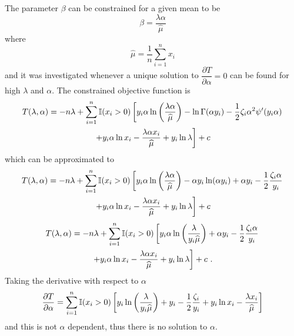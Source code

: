 The parameter $\beta$ can be constrained for a given mean to be
\begin{equation}
  \beta = \frac{\lambda\alpha}{\widehat{\mu}}
  \label{eq:compoundPoisson:beta_restrict}
\end{equation}
where
\begin{equation}
  \widehat{\mu} = \frac{1}{n}\sum_{i=1}^n x_i
\end{equation}
and it was investigated whenever a unique solution to $\dfrac{\partial T}{\partial \alpha} = 0$ can be found for high $\lambda$ and $\alpha$. The constrained objective function is
\begin{multline}
  T(\lambda,\alpha)
  =
  -n\lambda+
  \sum_{i=1}^n
  \mathbb{I}(x_i>0)
  \left[
  y_i\alpha
  \ln\left(\frac{\lambda\alpha}{\widehat{\mu}}\right)-\ln\Gamma(\alpha y_i) - \frac{1}{2}\zeta_i\alpha^2\psi'(y_i\alpha)
  \right.
  \\
  \left.
    +y_i\alpha\ln x_i - \frac{\lambda\alpha x_i}{\widehat{\mu}}
    + y_i \ln \lambda
    \vphantom{\frac{1}{1}}
  \right]
  + c
\end{multline}
which can be approximated to
\begin{multline*}
  T(\lambda,\alpha)=
  -n\lambda+
  \sum_{i=1}^n
  \mathbb{I}(x_i>0)
  \left[
    y_i\alpha\ln\left(\frac{\lambda\alpha}{\widehat{\mu}}\right)-\alpha y_i\ln(\alpha y_i) + \alpha y_i - \frac{1}{2}\frac{\zeta_i\alpha}{y_i}
  \right.
  \\
  \left.
    +y_i\alpha\ln x_i - \frac{\lambda\alpha x_i}{\widehat{\mu}}
    + y_i \ln \lambda
    \vphantom{\frac{1}{1}}
  \right]
  + c
\end{multline*}
\begin{multline}
  T(\lambda,\alpha)=
  -n\lambda+
  \sum_{i=1}^n
  \mathbb{I}(x_i>0)
  \left[
    y_i\alpha\ln\left(\frac{\lambda}{y_i\widehat{\mu}}\right) + \alpha y_i - \frac{1}{2}\frac{\zeta_i\alpha}{y_i}
  \right.
  \\
  \left.
    +y_i\alpha\ln x_i - \frac{\lambda\alpha x_i}{\widehat{\mu}}
    + y_i \ln \lambda
    \vphantom{\frac{1}{1}}
  \right]
  + c
  \ .
\end{multline}
Taking the derivative with respect to $\alpha$
\begin{equation}
  \frac{\partial T}{\partial \alpha} =
  \sum_{i=1}^n
  \mathbb{I}(x_i>0)
  \left[
    y_i\ln\left(\frac{\lambda}{y_i\widehat{\mu}}\right)
    + y_i - \frac{1}{2}\frac{\zeta_i}{y_i}
    +y_i\ln x_i - \frac{\lambda x_i}{\widehat{\mu}}
    \vphantom{\frac{1}{1}}
  \right]
\end{equation}
and this is not $\alpha$ dependent, thus there is no solution to $\alpha$.

